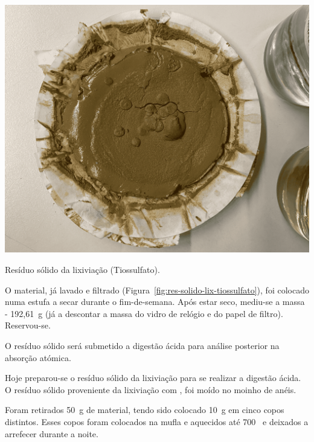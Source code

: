 \begin{marginfigure}
    \centering
    \includegraphics[width=0.9\linewidth]{figures/residuo_sol_lix_tiossulfato}
    \caption{Resíduo sólido da lixiviação (Tiossulfato).}
    \label{fig:res-solido-lix-tiossulfato}
\end{marginfigure}

O material, já lavado e filtrado (Figura~\ref{fig:res-solido-lix-tiossulfato}), foi colocado numa estufa a secar durante o fim-de-semana.
Após estar seco, mediu-se a massa - 192,61~g (já a descontar a massa do vidro de relógio e do papel de filtro).
Reservou-se.

O resíduo sólido será submetido a digestão ácida para análise posterior na absorção atómica.

\hrulefill


\label{day:19-novembro-2024}

Hoje preparou-se o resíduo sólido da lixiviação para se realizar a digestão ácida.
O resíduo sólido proveniente da lixiviação com \TSP{}, foi moído no moinho de anéis.

Foram retirados 50~g de material, tendo sido colocado 10~g em cinco copos distintos.
Esses copos foram colocados na mufla e aquecidos até 700~\graus{} e deixados a arrefecer durante a noite.


\hrulefill

\newpage


